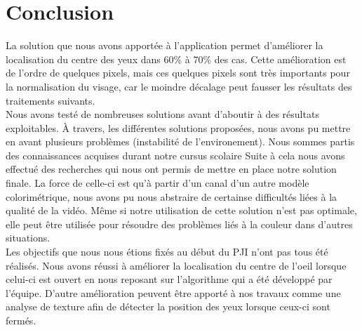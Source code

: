 \section{Conclusion}

La solution que nous avons apportée à l'application permet d'améliorer la localisation du centre des
yeux dans 60\% à 70\% des cas. Cette amélioration est de l'ordre de quelques pixels, mais ces quelques
pixels sont très importants pour la normalisation du visage, car le moindre décalage peut fausser les 
résultats des traitements suivants.\\

Nous avons testé de nombreuses solutions avant d'aboutir à des résultats exploitables. À travers, les différentes 
solutions proposées, nous avons pu mettre en avant plusieurs problèmes (instabilité de l'environement).
Nous sommes partis des connaissances acquises durant notre cursus scolaire 
Suite à cela nous avons effectué des recherches qui nous ont permis de mettre en place 
notre solution finale.
La force de celle-ci est qu'à partir d'un canal d'un autre modèle colorimétrique, nous avons pu 
nous abstraire de certainse difficultés liées à la qualité de la vidéo. Même si notre utilisation de cette
solution n'est pas optimale, elle peut être utilisée pour résoudre des problèmes liés à la couleur dans d'autres situations.\\

Les objectifs que nous nous étions fixés au début du PJI n'ont pas tous été réalisés. Nous avons réussi à
améliorer la localisation du centre de l'oeil lorsque celui-ci est ouvert en nous reposant sur 
l'algorithme qui a été développé par l'équipe. D'autre amélioration peuvent être apporté à nos travaux
comme une analyse de texture afin de détecter la position des yeux lorsque ceux-ci sont fermés.\\

